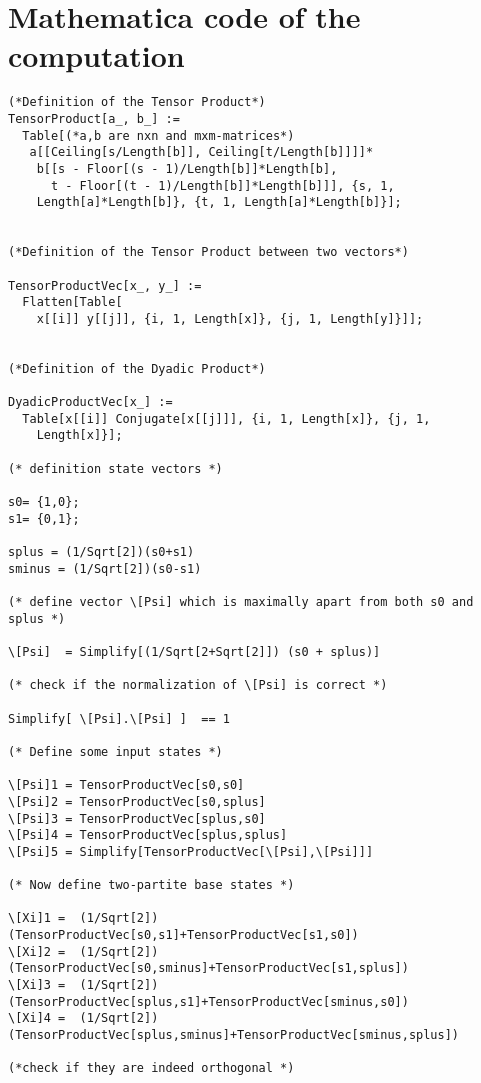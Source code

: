 \documentclass[%
 preprint,
 showpacs,
 showkeys,
 preprintnumbers,
 amsmath,amssymb,
 aps,
 pra,
  longbibliography,
 ]{revtex4-1}
\begin{document}
\appendix

\section{Mathematica code of the computation}

{
\footnotesize
\begin{verbatim}
(*Definition of the Tensor Product*)
TensorProduct[a_, b_] :=
  Table[(*a,b are nxn and mxm-matrices*)
   a[[Ceiling[s/Length[b]], Ceiling[t/Length[b]]]]*
    b[[s - Floor[(s - 1)/Length[b]]*Length[b],
      t - Floor[(t - 1)/Length[b]]*Length[b]]], {s, 1,
    Length[a]*Length[b]}, {t, 1, Length[a]*Length[b]}];


(*Definition of the Tensor Product between two vectors*)

TensorProductVec[x_, y_] :=
  Flatten[Table[
    x[[i]] y[[j]], {i, 1, Length[x]}, {j, 1, Length[y]}]];


(*Definition of the Dyadic Product*)

DyadicProductVec[x_] :=
  Table[x[[i]] Conjugate[x[[j]]], {i, 1, Length[x]}, {j, 1,
    Length[x]}];

(* definition state vectors *)

s0= {1,0};
s1= {0,1};

splus = (1/Sqrt[2])(s0+s1)
sminus = (1/Sqrt[2])(s0-s1)

(* define vector \[Psi] which is maximally apart from both s0 and splus *)

\[Psi]  = Simplify[(1/Sqrt[2+Sqrt[2]]) (s0 + splus)]

(* check if the normalization of \[Psi] is correct *)

Simplify[ \[Psi].\[Psi] ]  == 1

(* Define some input states *)

\[Psi]1 = TensorProductVec[s0,s0]
\[Psi]2 = TensorProductVec[s0,splus]
\[Psi]3 = TensorProductVec[splus,s0]
\[Psi]4 = TensorProductVec[splus,splus]
\[Psi]5 = Simplify[TensorProductVec[\[Psi],\[Psi]]]

(* Now define two-partite base states *)

\[Xi]1 =  (1/Sqrt[2]) (TensorProductVec[s0,s1]+TensorProductVec[s1,s0])
\[Xi]2 =  (1/Sqrt[2]) (TensorProductVec[s0,sminus]+TensorProductVec[s1,splus])
\[Xi]3 =  (1/Sqrt[2]) (TensorProductVec[splus,s1]+TensorProductVec[sminus,s0])
\[Xi]4 =  (1/Sqrt[2]) (TensorProductVec[splus,sminus]+TensorProductVec[sminus,splus])

(*check if they are indeed orthogonal *)


\end{verbatim}}
\end{document}
